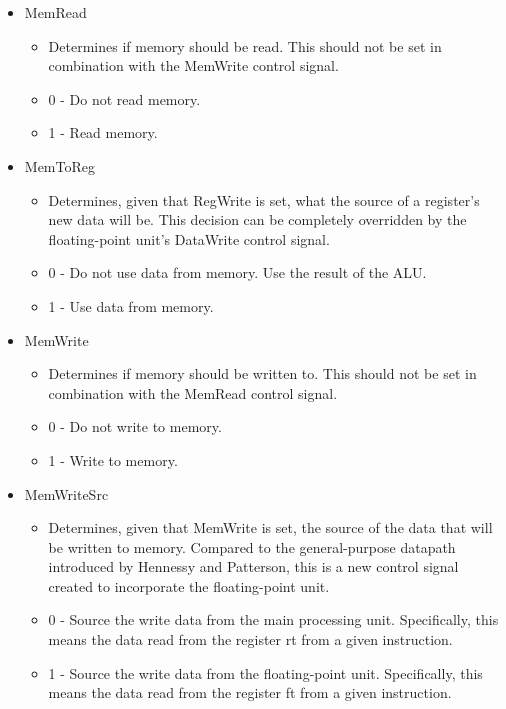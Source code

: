 \documentclass[
    paper=letter,
    parskip=half,
    fontsize=12pt,
    titlepage=firstiscover,
    toc=bibliography,
    numbers=endperiod
]{scrartcl}
\providecommand{\tightlist}{%
  \setlength{\itemsep}{0pt}\setlength{\parskip}{0pt}}
\begin{document}
\begin{itemize}
    \item MemRead
          \begin{itemize}
              \tightlist
              \item Determines if memory should be read. This should not be set in
                    combination with the MemWrite control signal.
              \item 0 - Do not read memory.
              \item 1 - Read memory.
          \end{itemize}

    \item MemToReg
          \begin{itemize}
              \tightlist
              \item Determines, given that RegWrite is set, what the source of a register's
                    new data will be. This decision can be completely overridden by the
                    floating-point unit's DataWrite control signal.
              \item 0 - Do not use data from memory. Use the result of the ALU.
              \item 1 - Use data from memory.
          \end{itemize}

    \item MemWrite
          \begin{itemize}
              \tightlist
              \item Determines if memory should be written to. This should not be set in
                    combination with the MemRead control signal.
              \item 0 - Do not write to memory.
              \item 1 - Write to memory.
          \end{itemize}

    \item MemWriteSrc
          \begin{itemize}
              \tightlist
              \item Determines, given that MemWrite is set, the source of the data that will
                    be written to memory. Compared to the general-purpose datapath
                    introduced by Hennessy and Patterson, this is a new control signal
                    created to incorporate the floating-point unit.
              \item 0 - Source the write data from the main processing unit.
                    Specifically, this means the data read from the register rt from a
                    given instruction.
              \item 1 - Source the write data from the floating-point unit.
                    Specifically, this means the data read from the register ft from a
                    given instruction.
          \end{itemize}


\end{itemize}
\end{document}
